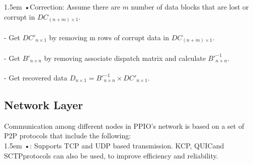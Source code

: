 \documentclass[10pt,a4paper]{article}
\begin{document}
\hangindent 1.5em
\noindent   
•\quad Correction: Assume there are $m$ number of data blocks that are lost or corrupt in $DC_{(n+m) \times 1}$.
\vspace{-1em}
\\\\
- Get $DC'_{n \times 1}$ by removing m rows of corrupt data in $DC_{(n+m) \times 1}$.
\vspace{-1em}
\\\\
- Get $B'_{n \times n}$ by removing associate dispatch matrix and calculate $B'^{-1}_{n \times n}$.
\vspace{-1em}
\\\\
- Get recovered data $D_{n \times 1} = B'^{-1}_{n \times n} \times DC'_{n \times 1}$.
\vspace{-0.5em}


        \subsection{Network Layer}  %
Communication among different nodes in PPIO’s network is based on a set of P2P protocols that include the following:
\vspace{-0.8em}
\\

\hangindent 1.5em
\noindent   
•: Supports TCP and UDP based transmission. KCP\cite{article8}, QUIC\cite{article9}and SCTP\cite{article10}protocols can also be used, to improve efficiency and reliability.
\vspace{-0.8em}
\\
\end{document}
